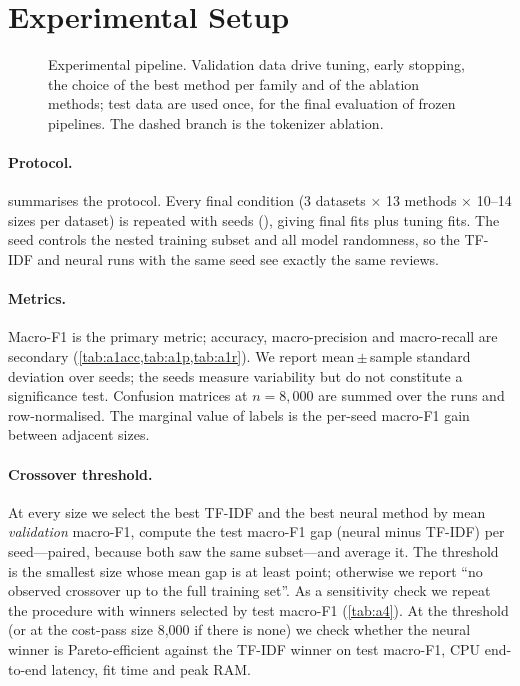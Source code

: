 \section{Experimental Setup}
\label{sec:setup}

\begin{figure}[t]
  \centering
  
  \caption{Experimental pipeline. Validation data drive tuning, early stopping, the choice
  of the best method per family and of the ablation methods; test data are used once, for
  the final evaluation of frozen pipelines. The dashed branch is the tokenizer ablation.}
  \label{fig:pipeline}
\end{figure}

\paragraph{Protocol.}
 summarises the protocol. Every final condition
(3 datasets $\times$ 13 methods $\times$ 10--14 sizes per dataset) is repeated with \nSeeds{} seeds
(\seedList), giving \nFinalFits{} final fits plus \nTuningFits{} tuning fits.
The seed controls the nested training subset and all model randomness, so the
TF-IDF and neural runs with the same seed see exactly the same reviews.

\paragraph{Metrics.}
Macro-F1 is the primary metric; accuracy, macro-precision and macro-recall are
secondary (\cref{tab:a1acc,tab:a1p,tab:a1r}). We report mean\,$\pm$\,sample standard deviation over seeds; the seeds
measure variability but do not constitute a significance test. Confusion matrices at
$n=8{,}000$ are summed over the \nSeeds{} runs and row-normalised. The marginal value of
labels is the per-seed macro-F1 gain between adjacent sizes.

\paragraph{Crossover threshold.}
At every size we select the best TF-IDF and the best neural method by mean
\emph{validation} macro-F1, compute the test macro-F1 gap (neural minus TF-IDF)
per seed---paired, because both saw the same subset---and average it. The
threshold is the smallest size whose mean gap is at least \crossoverMargin{} point;
otherwise we report ``no observed crossover up to the full training set''. As a sensitivity check we
repeat the procedure with winners selected by test macro-F1 (\cref{tab:a4}). At the
threshold (or at the cost-pass size 8{,}000 if there is none) we check whether the neural winner is
Pareto-efficient against the TF-IDF winner on test macro-F1, CPU end-to-end latency,
fit time and peak RAM.

